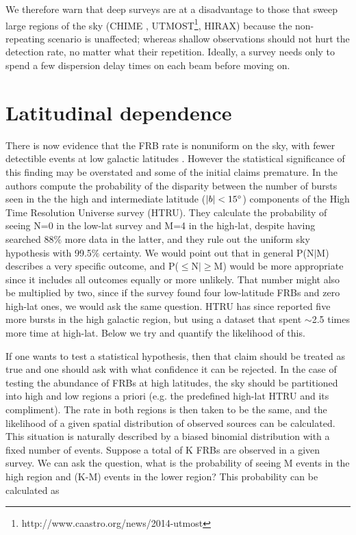 \documentclass[useAMS,usenatbib]{mn2e}
\begin{document}
We therefore warn that deep surveys are at a disadvantage 
to those that sweep large regions of the sky 
(CHIME  \citep{2014SPIE.9145E..22B}, 
UTMOST\footnote{http://www.caastro.org/news/2014-utmost}, HIRAX)
because the non-repeating 
scenario is unaffected; whereas shallow observations 
should not hurt the detection rate, no matter what their repetition. 
Ideally, a survey
needs only to spend a few dispersion delay times on each beam 
before moving on. 

\section{Latitudinal dependence}
\label{latitude}
There is now evidence that the FRB rate is nonuniform on the sky, 
with fewer detectible events at low galactic latitudes \citep{2014ira..book.....B}.
However the statistical significance of this finding may be 
overstated and some of the initial claims premature. In \cite{2014ApJ...789L..26P}
the authors compute the probability of the disparity between the number of 
bursts seen in the the high and intermediate latitude ($|b| < 15\degree$) components of the High Time Resolution Universe survey 
(HTRU). They calculate the probability of seeing N=0 in the low-lat survey and M=4 in 
the high-lat, despite having searched 88$\%$ more data in the latter, and they 
rule out the uniform sky hypothesis with 99.5$\%$ certainty. We would point out 
that in general P(N$|$M) describes a very specific outcome, and P($\le$N$|\ge$M) would be 
more appropriate since it includes all outcomes equally or more unlikely.
That number might also be multiplied by two, since if the survey found 
four low-latitude FRBs and zero high-lat ones, we would ask the same question. HTRU 
has since reported five more bursts in the high galactic region, but using a dataset 
that spent $\sim$2.5 times more time at high-lat. Below we try and quantify the likelihood of 
this.


If one wants to 
test a statistical hypothesis, then that claim should be treated as true and one should
ask with what confidence it can be rejected. 
In the case of testing the abundance of FRBs at high latitudes,
the sky should be partitioned into high and low regions a priori 
(e.g. the predefined high-lat HTRU and its compliment). The rate in both regions 
is then taken to be the same, and the likelihood of a given spatial distribution of observed
sources can be calculated. This situation is naturally
described by a biased binomial distribution with a fixed number of events. Suppose
a total of K FRBs are observed in a given survey. We can ask the question, what is the probability of 
seeing M events in the high region and (K-M) events in the lower region? 
This probability can be calculated %
as 
\end{document}
